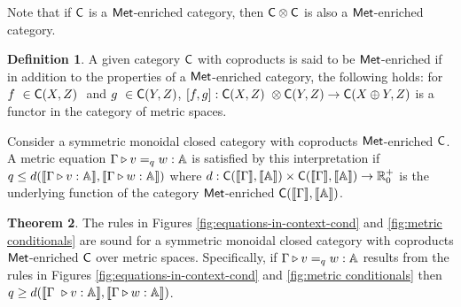 \documentclass[10pt,a4paper]{amsart}
\theoremstyle{definition}
\newtheorem{definition}{Definition}[section]
\theoremstyle{definition}
\theoremstyle{definition}
\theoremstyle{definition}
\theoremstyle{definition}
\theoremstyle{definition}
\newtheorem{theorem}[definition]{Theorem}
\begin{document}

Note that if $\mathsf{C}$ is a  $\mathsf{Met}$-enriched category, then $\mathsf{C} \otimes \mathsf{C}$ is also a  $\mathsf{Met}$-enriched category.


\begin{definition}
  A given category $\mathsf{C}$ with coproducts is said to be $\mathsf{Met}$-enriched if in addition to the properties of a  $\mathsf{Met}$-enriched category, the following holds: for $f  \in \catC(X,Z)  $ and $g  \in \catC(Y,Z) $, $ [f,g]:\catC(X,Z)  \otimes \catC(Y,Z) \rightarrow \catC(X \oplus Y,Z) $ is a functor in the category of metric spaces.
 \end{definition}








Consider a symmetric monoidal closed category with coproducts $\mathsf{Met}$-enriched $\mathsf{C}$. A metric equation $\Gamma \triangleright v =_{q} w : \mathbb{A} $ is satisfied by this interpretation if $q \leq d( \llbracket \Gamma  \triangleright v : \mathbb{A} \rrbracket, \llbracket\Gamma \triangleright w : \mathbb{A} \rrbracket)$ where $d : \mathsf{C}(\llbracket \Gamma \rrbracket, \llbracket \mathbb{A} \rrbracket) \times \mathsf{C}(\llbracket \Gamma \rrbracket, \llbracket \mathbb{A} \rrbracket) \rightarrow \mathbb{R}_0^+$ is the underlying function of the category  $\mathsf{Met}$-enriched $\mathsf{C}(\llbracket \Gamma \rrbracket, \llbracket \mathbb{A} \rrbracket)$.

\begin{theorem}
  The rules in Figures \ref{fig:equations-in-context-cond} and \ref{fig:metric conditionals} are sound for a symmetric monoidal closed category with coproducts $\mathsf{Met}$-enriched $\mathsf{C}$ over metric spaces. Specifically, if $\Gamma \triangleright v =_{q} w : \mathbb{A} $ results from the rules in Figures \ref{fig:equations-in-context-cond} and \ref{fig:metric conditionals} then $q \geq d( \llbracket \Gamma  \vljud v : \typeA \rrbracket, \llbracket\Gamma \vljud w : \typeA \rrbracket)$.
\end{theorem}
\end{document}
